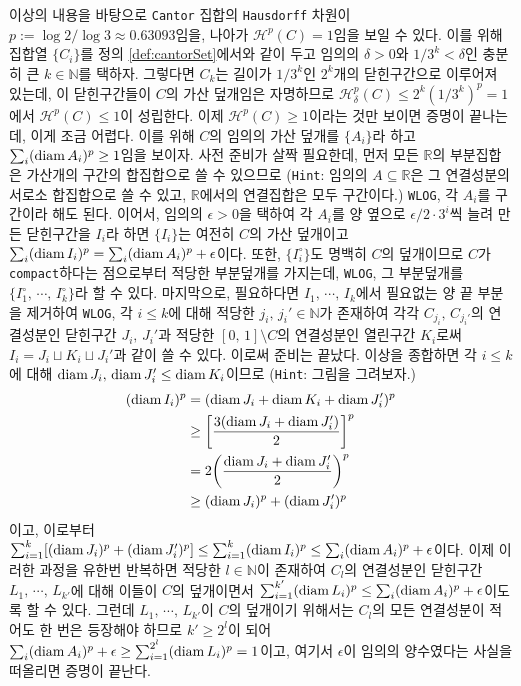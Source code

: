 \begin{enumerate}[label = \textsf{\textbf{\arabic*}}]
    이상의 내용을 바탕으로 \texttt{Cantor} 집합의 \texttt{Hausdorff} 차원이 $p:=\log2/\log3\approx0.63093$임을, 나아가 $\mathcal{H}^p(C)=1$임을 보일 수 있다. 이를 위해 집합열 $\{C_i\}$를 정의 \ref{def:cantorSet}에서와 같이 두고 임의의 $\delta>0$와 $1/3^k<\delta$인 충분히 큰 $k\in\mathbb{N}$를 택하자. 그렇다면 $C_k$는 길이가 $1/3^k$인 $2^k$개의 닫힌구간으로 이루어져 있는데, 이 닫힌구간들이 $C$의 가산 덮개임은 자명하므로 $\mathcal{H}_\delta^p(C)\leq2^k(1/3^k)^p=1$에서 $\mathcal{H}^p(C)\leq1$이 성립한다. 이제 $\mathcal{H}^p(C)\geq1$이라는 것만 보이면 증명이 끝나는데, 이게 조금 어렵다. 이를 위해 $C$의 임의의 가산 덮개를 $\{A_i\}$라 하고 $\sum_i(\mathrm{diam}\, A_i)^p\geq1$임을 보이자. 사전 준비가 살짝 필요한데, 먼저 모든 $\mathbb{R}$의 부분집합은 가산개의 구간의 합집합으로 쓸 수 있으므로 (\texttt{Hint}: 임의의 $A\subseteq\mathbb{R}$은 그 연결성분의 서로소 합집합으로 쓸 수 있고, $\mathbb{R}$에서의 연결집합은 모두 구간이다.) \texttt{WLOG}, 각 $A_i$를 구간이라 해도 된다. 이어서, 임의의 $\epsilon>0$을 택하여 각 $A_i$를 양 옆으로 $\epsilon/2\cdot 3^i$씩 늘려 만든 닫힌구간을 $I_i$라 하면 $\{I_i\}$는 여전히 $C$의 가산 덮개이고 $\sum_i(\mathrm{diam}\, I_i)^p=\sum_i(\mathrm{diam}\, A_i)^p+\epsilon$이다. 또한, $\{I_i^\circ\}$도 명백히 $C$의 덮개이므로 $C$가 \texttt{compact}하다는 점으로부터 적당한 부분덮개를 가지는데, \texttt{WLOG}, 그 부분덮개를 $\{I_1^\circ,\,\cdots,\,I_k^\circ\}$라 할 수 있다. 마지막으로, 필요하다면 $I_1,\,\cdots,\,I_k$에서 필요없는 양 끝 부분을 제거하여 \texttt{WLOG}, 각 $i\leq k$에 대해 적당한 $j_i,\,j_i'\in\mathbb{N}$가 존재하여 각각 $C_{j_i},\,C_{j_i'}$의 연결성분인 닫힌구간 $J_i,\,J_i'$과 적당한 $[0,\,1]\setminus C$의 연결성분인 열린구간 $K_i$로써 $I_i=J_i\sqcup K_i\sqcup J_i'$과 같이 쓸 수 있다. 이로써 준비는 끝났다. 이상을 종합하면 각 $i\leq k$에 대해 $\mathrm{diam}\, J_i,\,\mathrm{diam}\, J_i'\leq\mathrm{diam}\, K_i$이므로 (\texttt{Hint}: 그림을 그려보자.)
    \begin{align*}
        (\mathrm{diam}\, I_i)^p&=(\mathrm{diam}\, J_i+\mathrm{diam}\, K_i+\mathrm{diam}\, J_i')^p\\
        &\geq\bigg[\frac{3(\mathrm{diam}\, J_i+\mathrm{diam}\, J_i')}{2}\bigg]^p\\
        &=2\bigg(\frac{\mathrm{diam}\, J_i+\mathrm{diam}\, J_i'}{2}\bigg)^p\\
        &\geq(\mathrm{diam}\, J_i)^p+(\mathrm{diam}\, J_i')^p
    \end{align*}
    이고, 이로부터 $\sum_{i=1}^k[(\mathrm{diam}\, J_i)^p+(\mathrm{diam}\, J_i')^p]\leq\sum_{i=1}^k(\mathrm{diam}\, I_i)^p\leq\sum_i(\mathrm{diam}\, A_i)^p+\epsilon$이다. 이제 이러한 과정을 유한번 반복하면 적당한 $l\in\mathbb{N}$이 존재하여 $C_l$의 연결성분인 닫힌구간 $L_1,\,\cdots,\,L_{k'}$에 대해 이들이 $C$의 덮개이면서 $\sum_{i=1}^{k'}(\mathrm{diam}\, L_i)^p\leq\sum_i(\mathrm{diam}\, A_i)^p+\epsilon$이도록 할 수 있다. 그런데 $L_1,\,\cdots,\,L_{k'}$이 $C$의 덮개이기 위해서는 $C_l$의 모든 연결성분이 적어도 한 번은 등장해야 하므로 $k'\geq2^l$이 되어 $\sum_i(\mathrm{diam}\, A_i)^p+\epsilon\geq\sum_{i=1}^{2^l}(\mathrm{diam}\, L_i)^p=1$이고, 여기서 $\epsilon$이 임의의 양수였다는 사실을 떠올리면 증명이 끝난다.

\end{enumerate}
